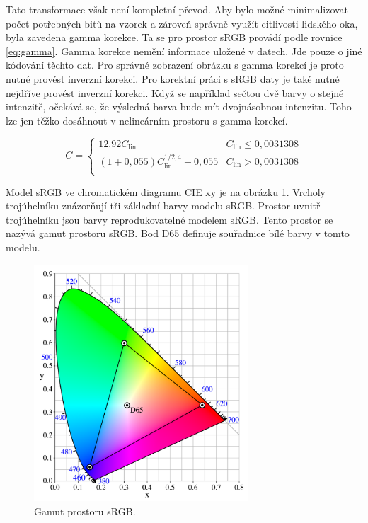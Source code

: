 \documentclass[a4paper, 12pt, titlepage]{article}
\begin{document}
  Tato transformace však není kompletní převod.
  Aby bylo možné minimalizovat počet potřebných bitů na vzorek a zároveň správně využít citlivosti lidského oka, byla zavedena gamma korekce.
  Ta se pro prostor sRGB provádí podle rovnice \ref{eq:gamma}.
  Gamma korekce nemění informace uložené v datech.
  Jde pouze o jiné kódování těchto dat.
  Pro správné zobrazení obrázku s gamma korekcí je proto nutné provést inverzní korekci.
  Pro korektní práci s sRGB daty je také nutné nejdříve provést inverzní korekci.
  Když se například sečtou dvě barvy o stejné intenzitě, očekává se, že výsledná barva bude mít dvojnásobnou intenzitu.
  Toho lze jen těžko dosáhnout v nelineárním prostoru s gamma korekcí. \cite{srgb}

  \begin{equation}
    C = \left\{
    \begin{array}{ll}
       12.92C_{\mathrm{lin}} & C_{\mathrm{lin}} \leq 0,0031308\\
       (1 + 0,055)C_{\mathrm{lin}}^{1/2,4} - 0,055 & C_{\mathrm{lin}} > 0,0031308\\
    \end{array}
    \right.
    \label{eq:gamma}
  \end{equation}

  Model sRGB ve chromatickém diagramu CIE xy je na obrázku \ref{fig:CIExy1931_sRGB}.
  Vrcholy trojúhelníku znázorňují tři základní barvy modelu sRGB.
  Prostor uvnitř trojúhelníku jsou barvy reprodukovatelné modelem sRGB.
  Tento prostor se nazývá gamut prostoru sRGB.
  Bod D65 definuje souřadnice bílé barvy v tomto modelu. \cite{Walker1996, srgb}

  \begin{figure}[h!]
  \centering
  \includegraphics[width=8cm]{CIExy1931_sRGB.png}
  \caption{Gamut prostoru sRGB.}
  \label{fig:CIExy1931_sRGB}
  \end{figure}
\end{document}
